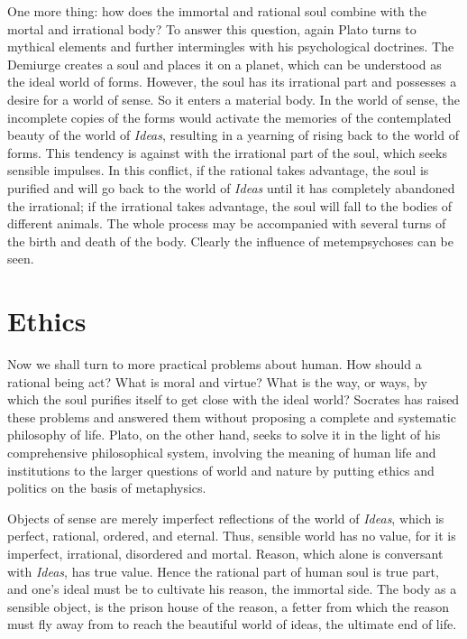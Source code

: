 \documentclass[11pt]{article}
\begin{document}
One more thing: 
how does the immortal and rational soul combine with the mortal and irrational body? 
To answer this question, again Plato turns to mythical elements and further intermingles with his psychological doctrines. 
The Demiurge creates a soul and places it on a planet, which can be understood as the ideal world of forms. 
However, the soul has its irrational part and possesses a desire for a world of sense. 
So it enters a material body. 
In the world of sense, the incomplete copies of the forms would activate the memories of the contemplated beauty of the world of \textit{Ideas}, resulting in a yearning of rising back to the world of forms. 
This tendency is against with the irrational part of the soul, which seeks sensible impulses. 
In this conflict, if the rational takes advantage, the soul is purified and will go back to the world of \textit{Ideas} until it has completely abandoned the irrational; 
if the irrational takes advantage, the soul will fall to the bodies of different animals. 
The whole process may be accompanied with several turns of the birth and death of the body. 
Clearly the influence of metempsychoses can be seen.
  
\section{Ethics}
Now we shall turn to more practical problems about human. 
How should a rational being act? 
What is moral and virtue? 
What is the way, or ways, by which the soul purifies itself to get close with the ideal world? 
Socrates has raised these problems and answered them without proposing a complete and systematic philosophy of life. 
Plato, on the other hand, seeks to solve it in the light of his comprehensive philosophical system, involving the meaning of human life and institutions to the larger questions of world and nature by putting ethics and politics on the basis of metaphysics.

\newline

Objects of sense are merely imperfect reflections of the world of \textit{Ideas}, which is perfect, rational, ordered, and eternal. 
Thus, sensible world has no value, for it is imperfect, irrational, disordered and mortal. 
Reason, which alone is conversant with \textit{Ideas}, has true value. 
Hence the rational part of human soul is true part, and one’s ideal must be to cultivate his reason, the immortal side. 
The body as a sensible object, is the prison house of the reason, a fetter from which the reason must fly away from to reach the beautiful world of ideas, the ultimate end of life.
\end{document}
